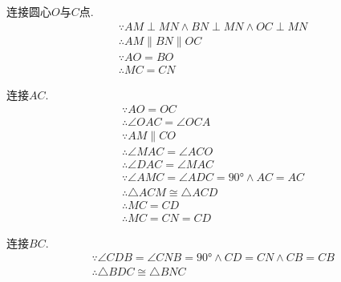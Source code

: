 \begin{questions}
\begin{proofsolution}
\begin{center}
\begin{tikzpicture}[scale=1.5]
			\end{tikzpicture}
		\end{center}
		\begin{penum}
			\item
			      \begin{cenum}
				      \item 连接圆心$O$与$C$点.
				            \begin{align*}
					             & \because AM \perp MN \land BN \perp MN  \land OC \perp MN \\
					             & \therefore AM \parallel BN \parallel OC                   \\
					             & \because AO = BO                                          \\
					             & \therefore MC = CN
				            \end{align*}
				      \item	连接$AC$.
				            \begin{align*}
					             & \because AO = OC                                            \\
					             & \therefore \angle{OAC} = \angle{OCA}                        \\
					             & \because AM \parallel CO                                    \\
					             & \therefore \angle{MAC} = \angle{ACO}                        \\
					             & \therefore \angle{DAC} = \angle{MAC}                        \\
					             & \because \angle{AMC} = \angle{ADC} = \ang{90} \land AC = AC \\
					             & \therefore \triangle{ACM} \cong \triangle{ACD}              \\
					             & \therefore MC = CD                                          \\
					             & \therefore MC = CN = CD
				            \end{align*}
			      \end{cenum}
			\item 连接$BC$.
			      \begin{align*}
				       & \because \angle{CDB} = \angle{CNB} = \ang{90} \land CD = CN \land CB = CB                   \\
				       & \therefore \triangle{BDC} \cong \triangle{BNC}                                              \\

\end{align*}
\end{penum}
\end{proofsolution}
\end{questions}
